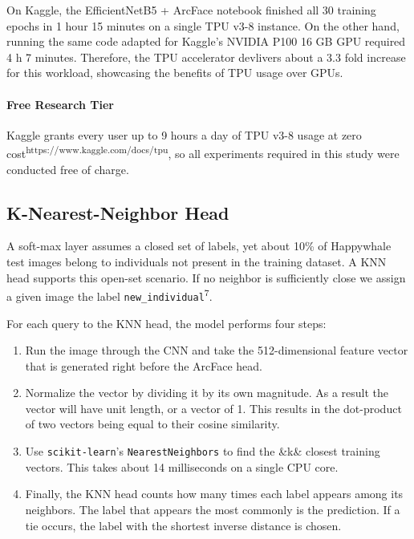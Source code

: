\documentclass[twocolumn]{article}
\begin{document}
On Kaggle, the EfficientNetB5 + ArcFace notebook finished all 30 training epochs in 1 hour 15 minutes on a single TPU v3-8 instance.
On the other hand, running the same code adapted for Kaggle's NVIDIA P100 16 GB GPU required 4 h 7 minutes.
Therefore, the TPU accelerator devlivers about a 3.3 fold increase for this workload, showcasing the benefits of  TPU usage over GPUs.

\paragraph{Free Research Tier}

Kaggle grants every user up to 9 hours a day of TPU v3-8 usage at zero cost\textsuperscript{https://www.kaggle.com/docs/tpu}, so all experiments required in this study were conducted free of charge.

\subsection{K-Nearest-Neighbor Head}

A soft-max layer assumes a closed set of labels, yet about 10\% of Happywhale test images belong to individuals not present in the training dataset. A KNN head supports this open-set scenario. If no neighbor is sufficiently close we assign a given image the label \texttt{new_individual}\textsuperscript{7}.

For each query to the KNN head, the model performs four steps:
\begin{enumerate}
    \item Run the image through the CNN and take the 512-dimensional feature vector that is generated right before the ArcFace head.
    \item Normalize the vector by dividing it by its own magnitude. As a result the vector will have unit length, or a vector of 1. This results in the dot-product of two vectors being equal to their cosine similarity.
    \item Use \texttt{scikit-learn}'s \texttt{NearestNeighbors} to find the &k& closest training vectors. This takes about 14 milliseconds on a single CPU core.
    \item Finally, the KNN head counts how many times each label appears among its neighbors.  The label that appears the most commonly is the prediction. If a tie occurs, the label with the shortest inverse distance is chosen.\\
\end{enumerate}
\end{document}
